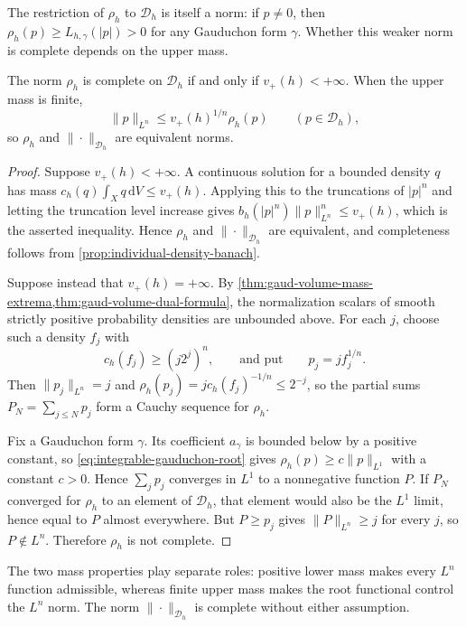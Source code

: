 The restriction of $\rho_h$ to $\mathcal D_h$ is itself a norm: if $p\ne0$, then $\rho_h(p)\geq L_{h,\gamma}(|p|)>0$ for any Gauduchon form $\gamma$. Whether this weaker norm is complete depends on the upper mass.

\begin{proposition}\label{prop:individual-root-completeness}
The norm $\rho_h$ is complete on $\mathcal D_h$ if and only if $v_+(h)<+\infty$. When the upper mass is finite,
\[
 \|p\|_{L^n}\leq v_+(h)^{1/n}\rho_h(p)\qquad(p\in\mathcal D_h),
\]
so $\rho_h$ and $\|\cdot\|_{\mathcal D_h}$ are equivalent norms.
\end{proposition}
\begin{proof}
Suppose $v_+(h)<+\infty$. A continuous solution for a bounded density $q$ has mass $c_h(q)\int_Xq\,\mathrm{d}V\leq v_+(h)$. Applying this to the truncations of $|p|^n$ and letting the truncation level increase gives $b_h(|p|^n)\|p\|_{L^n}^n\leq v_+(h)$, which is the asserted inequality. Hence $\rho_h$ and $\|\cdot\|_{\mathcal D_h}$ are equivalent, and completeness follows from \cref{prop:individual-density-banach}.

Suppose instead that $v_+(h)=+\infty$. By \cref{thm:gaud-volume-mass-extrema,thm:gaud-volume-dual-formula}, the normalization scalars of smooth strictly positive probability densities are unbounded above. For each $j$, choose such a density $f_j$ with
\[
 c_h(f_j)\geq(j2^j)^n,
 \qquad\text{and put}\qquad p_j=jf_j^{1/n}.
\]
Then $\|p_j\|_{L^n}=j$ and $\rho_h(p_j)=jc_h(f_j)^{-1/n}\leq2^{-j}$, so the partial sums $P_N=\sum_{j\leq N}p_j$ form a Cauchy sequence for $\rho_h$.

Fix a Gauduchon form $\gamma$. Its coefficient $a_\gamma$ is bounded below by a positive constant, so \eqref{eq:integrable-gauduchon-root} gives $\rho_h(p)\geq c\|p\|_{L^1}$ with a constant $c>0$. Hence $\sum_jp_j$ converges in $L^1$ to a nonnegative function $P$. If $P_N$ converged for $\rho_h$ to an element of $\mathcal D_h$, that element would also be the $L^1$ limit, hence equal to $P$ almost everywhere. But $P\geq p_j$ gives $\|P\|_{L^n}\geq j$ for every $j$, so $P\notin L^n$. Therefore $\rho_h$ is not complete.
\end{proof}

The two mass properties play separate roles: positive lower mass makes every $L^n$ function admissible, whereas finite upper mass makes the root functional control the $L^n$ norm. The norm $\|\cdot\|_{\mathcal D_h}$ is complete without either assumption.

